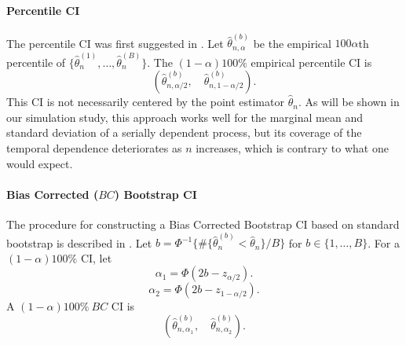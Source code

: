 \documentclass[12pt, letterpaper, titlepage]{article}
\begin{document}
\paragraph{Percentile CI}
The percentile CI was first suggested in \citet{efron1979bootstrap}.
Let $\hat\theta_{n, \alpha}^{(b)}$ be the empirical $100\alpha$th percentile of
$\{\hat\theta_n^{(1)}, \ldots, \hat\theta_n^{(B)}\}$. The $(1 - \alpha)100\%$
empirical percentile CI is
\[
(\hat\theta_{n, \alpha/2}^{(b)}, \quad \hat\theta_{n, 1 - \alpha/2}^{(b)}).
\]
This CI is not necessarily centered by the point estimator $\hat\theta_n$.
As will be shown in our simulation study, this approach works well for the
marginal mean and standard deviation of a serially dependent process, but its
coverage of the temporal dependence deteriorates as $n$ increases, which is
contrary to what one would expect.


\paragraph{Bias Corrected ($BC$) Bootstrap CI}
The procedure for constructing a Bias Corrected Bootstrap CI based on standard
bootstrap is
described in \citet{carpenter2000bootstrap}.
Let $b = \Phi^{-1}\{\#\{\hat\theta_n^{(b)} < \hat{\theta}_n\} / B\}$
for $b \in \{1, \ldots, B\}$. 
For a $(1 - \alpha)100\%$ CI, let
\[
\alpha_1 = \Phi(2b - z_{\alpha/2}).
\]
\[
\alpha_2 = \Phi(2b - z_{1 - \alpha/2}).
\]
A $(1 - \alpha)100\%~BC$ CI is
\[
(\hat\theta_{n, \alpha_1}^{(b)}, \quad \hat\theta_{n, \alpha_2}^{(b)}).
\]
\end{document}
